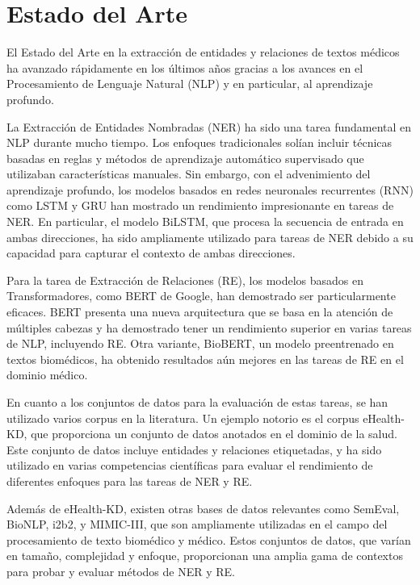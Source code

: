 \documentclass[10pt]{article} %
\begin{document}
	\section{Estado del Arte}
	El Estado del Arte en la extracción de entidades y relaciones de textos médicos ha avanzado rápidamente en los últimos años gracias a los avances en el Procesamiento de Lenguaje Natural (NLP) y en particular, al aprendizaje profundo.
	
	La Extracción de Entidades Nombradas (NER) ha sido una tarea fundamental en NLP durante mucho tiempo. Los enfoques tradicionales solían incluir técnicas basadas en reglas y métodos de aprendizaje automático supervisado que utilizaban características manuales. Sin embargo, con el advenimiento del aprendizaje profundo, los modelos basados en redes neuronales recurrentes (RNN) como LSTM y GRU han mostrado un rendimiento impresionante en tareas de NER. En particular, el modelo BiLSTM, que procesa la secuencia de entrada en ambas direcciones, ha sido ampliamente utilizado para tareas de NER debido a su capacidad para capturar el contexto de ambas direcciones.
	
	Para la tarea de Extracción de Relaciones (RE), los modelos basados en Transformadores, como BERT de Google, han demostrado ser particularmente eficaces. BERT presenta una nueva arquitectura que se basa en la atención de múltiples cabezas y ha demostrado tener un rendimiento superior en varias tareas de NLP, incluyendo RE. Otra variante, BioBERT, un modelo preentrenado en textos biomédicos, ha obtenido resultados aún mejores en las tareas de RE en el dominio médico.
	
	En cuanto a los conjuntos de datos para la evaluación de estas tareas, se han utilizado varios corpus en la literatura. Un ejemplo notorio es el corpus eHealth-KD, que proporciona un conjunto de datos anotados en el dominio de la salud. Este conjunto de datos incluye entidades y relaciones etiquetadas, y ha sido utilizado en varias competencias científicas para evaluar el rendimiento de diferentes enfoques para las tareas de NER y RE.
	
	Además de eHealth-KD, existen otras bases de datos relevantes como SemEval, BioNLP, i2b2, y MIMIC-III, que son ampliamente utilizadas en el campo del procesamiento de texto biomédico y médico. Estos conjuntos de datos, que varían en tamaño, complejidad y enfoque, proporcionan una amplia gama de contextos para probar y evaluar métodos de NER y RE.
	
\end{document}
